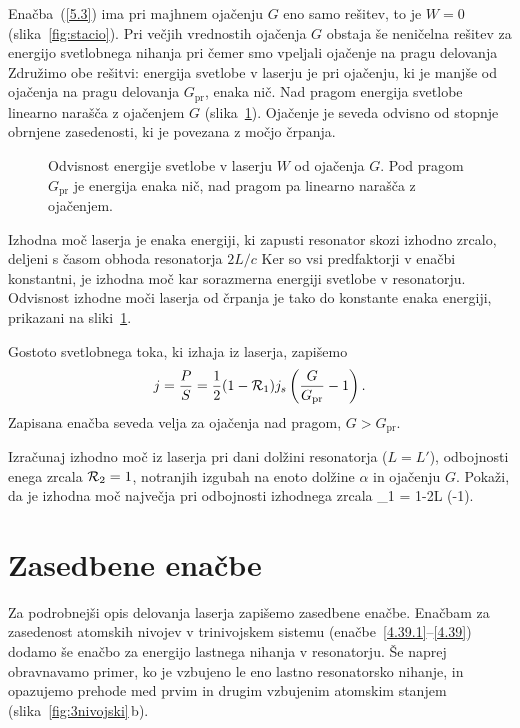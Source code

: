 Enačba~(\ref{5.3}) ima pri majhnem ojačenju $G$ eno samo rešitev, to je 
$W=0$ (slika~\ref{fig:stacio}). Pri večjih vrednostih ojačenja $G$ obstaja še neničelna rešitev
za energijo svetlobnega nihanja 
pri čemer smo vpeljali ojačenje na pragu delovanja
Združimo obe rešitvi: energija svetlobe v laserju je pri ojačenju, ki je manjše
od ojačenja na pragu delovanja $G_\mathrm{pr}$, enaka
nič. Nad pragom energija svetlobe linearno narašča z ojačenjem $G$ (slika~\ref{fig:energija}).
Ojačenje je seveda odvisno od stopnje obrnjene zasedenosti, ki je povezana
z močjo črpanja.
\begin{figure}[h]
\centering
\def\svgwidth{60truemm} 

\caption{Odvisnost energije svetlobe v laserju $W$ od ojačenja $G$. 
Pod pragom $G_\mathrm{pr}$ je energija enaka nič, 
nad pragom pa linearno narašča z ojačenjem.}
\label{fig:energija}
\end{figure}

Izhodna moč laserja je enaka energiji, ki zapusti
resonator skozi izhodno zrcalo, deljeni s časom obhoda resonatorja $2L/c$ 
Ker so vsi predfaktorji v enačbi konstantni, je izhodna moč kar sorazmerna
energiji svetlobe v resonatorju. Odvisnost izhodne moči laserja od črpanja je 
tako do konstante enaka energiji, prikazani na sliki~\ref{fig:energija}. 

Gostoto svetlobnega toka, ki izhaja iz laserja, zapišemo 
\begin{equation}
 j = \frac{P}{S} = \frac{1}{2} (1-{\cal {R}}_{1}) j_s \left(\frac{G}{G_\mathrm{pr}}-1\right).
\end{equation}
Zapisana enačba seveda velja za ojačenja nad pragom, $G>G_\mathrm{pr}$.

\begin{naloga}
Izračunaj izhodno moč iz laserja pri dani dolžini resonatorja ($L=L'$), 
odbojnosti enega zrcala ${\cal {R}}_{2}=1$, 
notranjih izgubah na enoto dolžine $\alpha$ in ojačenju $G$. Pokaži, da
je izhodna moč največja pri odbojnosti izhodnega zrcala 
\beq
{}_1 = 1-2\alpha L \left(-1\right).
\eeq
\end{naloga}

\section{Zasedbene enačbe}
Za podrobnejši opis delovanja laserja zapišemo zasedbene enačbe. 
Enačbam za zasedenost atomskih nivojev 
v trinivojskem sistemu (enačbe~\ref{4.39.1}--\ref{4.39}) dodamo še enačbo za 
energijo lastnega nihanja v resonatorju. Še naprej obravnavamo primer, ko je 
vzbujeno le eno lastno resonatorsko nihanje, in opazujemo prehode  med prvim 
in drugim vzbujenim atomskim stanjem (slika~\ref{fig:3nivojski}\,b). 

